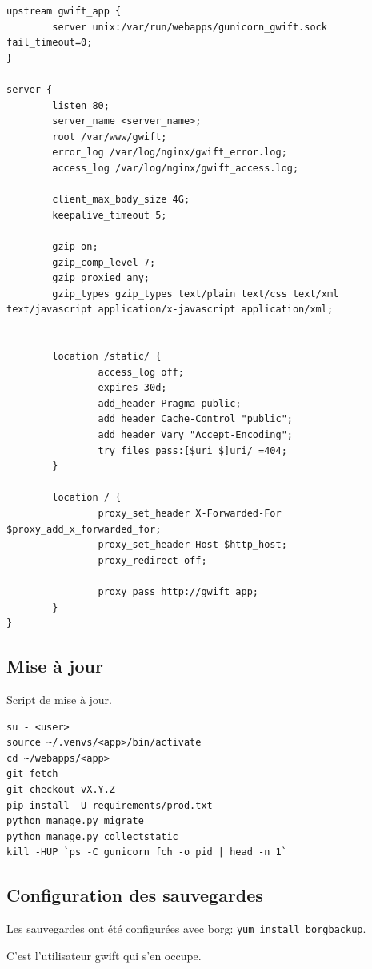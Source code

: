\documentclass[11pt]{amsbook}
\begin{document}
\begin{verbatim}
upstream gwift_app {
        server unix:/var/run/webapps/gunicorn_gwift.sock fail_timeout=0;
}

server {
        listen 80;
        server_name <server_name>;
        root /var/www/gwift;
        error_log /var/log/nginx/gwift_error.log;
        access_log /var/log/nginx/gwift_access.log;

        client_max_body_size 4G;
        keepalive_timeout 5;

        gzip on;
        gzip_comp_level 7;
        gzip_proxied any;
        gzip_types gzip_types text/plain text/css text/xml text/javascript application/x-javascript application/xml;


        location /static/ { 
                access_log off;
                expires 30d;
                add_header Pragma public;
                add_header Cache-Control "public";
                add_header Vary "Accept-Encoding";
                try_files pass:[$uri $]uri/ =404;
        }

        location / {
                proxy_set_header X-Forwarded-For $proxy_add_x_forwarded_for; 
                proxy_set_header Host $http_host;
                proxy_redirect off;

                proxy_pass http://gwift_app;
        }
}
\end{verbatim}


\hypertarget{x-mise-à-jour}{\subsection{Mise à jour}}
Script de mise à jour.


\begin{verbatim}
su - <user>
source ~/.venvs/<app>/bin/activate
cd ~/webapps/<app>
git fetch
git checkout vX.Y.Z
pip install -U requirements/prod.txt
python manage.py migrate
python manage.py collectstatic
kill -HUP `ps -C gunicorn fch -o pid | head -n 1` 
\end{verbatim}


\hypertarget{x-configuration-des-sauvegardes}{\subsection{Configuration des sauvegardes}}
Les sauvegardes ont été configurées avec borg: \texttt{yum install borgbackup}.


C’est l’utilisateur gwift qui s’en occupe.
\end{document}
